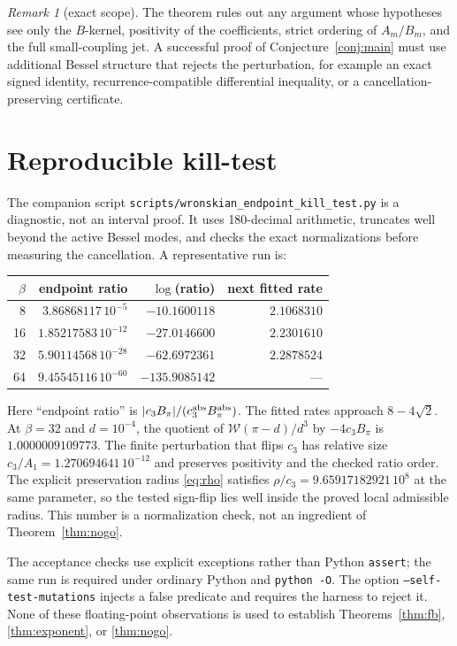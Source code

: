 \documentclass[11pt]{article}
\theoremstyle{definition}
\theoremstyle{remark}
\newtheorem{remark}[theorem]{Remark}
\newcommand{\W}{\mathcal W}
\begin{document}
\begin{remark}[exact scope]
The theorem rules out any argument whose hypotheses see only the $B$-kernel,
positivity of the coefficients, strict ordering of $A_m/B_m$, and the full
small-coupling jet.  A successful proof of Conjecture~\ref{conj:main} must
use additional Bessel structure that rejects the perturbation, for example
an exact signed identity, recurrence-compatible differential inequality,
or a cancellation-preserving certificate.
\end{remark}

\section{Reproducible kill-test}

The companion script
\texttt{scripts/wronskian\_endpoint\_kill\_test.py} is a diagnostic, not
an interval proof.  It uses 180-decimal arithmetic, truncates well beyond
the active Bessel modes, and checks the exact normalizations before
measuring the cancellation.  A representative run is:
\begin{center}
\begin{tabular}{@{}rrrr@{}}
\toprule
$\beta$ & endpoint ratio & $\log$(ratio) & next fitted rate\\
\midrule
8  & $3.86868117\,10^{-5}$  & $-10.1600118$ & $2.1068310$\\
16 & $1.85217583\,10^{-12}$ & $-27.0146600$ & $2.2301610$\\
32 & $5.90114568\,10^{-28}$ & $-62.6972361$ & $2.2878524$\\
64 & $9.45545116\,10^{-60}$ & $-135.9085142$ & ---\\
\bottomrule
\end{tabular}
\end{center}
Here ``endpoint ratio'' is
$|c_3B_\pi|/(c_3^{\rm abs}B_\pi^{\rm abs})$.  The fitted rates approach
$8-4\sqrt2$.  At $\beta=32$ and $d=10^{-4}$, the quotient of
$\W(\pi-d)/d^3$ by $-4c_3B_\pi$ is $1.0000009109773$.  The finite
perturbation that flips $c_3$ has relative size
$c_3/A_1=1.270694641\,10^{-12}$ and preserves positivity and the checked
ratio order.  The explicit preservation radius \eqref{eq:rho} satisfies
$\rho/c_3=9.65917182921\,10^8$ at the same parameter, so the tested
sign-flip lies well inside the proved local admissible radius.  This number
is a normalization check, not an ingredient of Theorem~\ref{thm:nogo}.

The acceptance checks use explicit exceptions rather than Python
\texttt{assert}; the same run is required under ordinary Python and
\texttt{python -O}.  The option \texttt{--self-test-mutations} injects a
false predicate and requires the harness to reject it.  None of these
floating-point observations is used to establish
Theorems~\ref{thm:fb}, \ref{thm:exponent}, or \ref{thm:nogo}.
\end{document}
